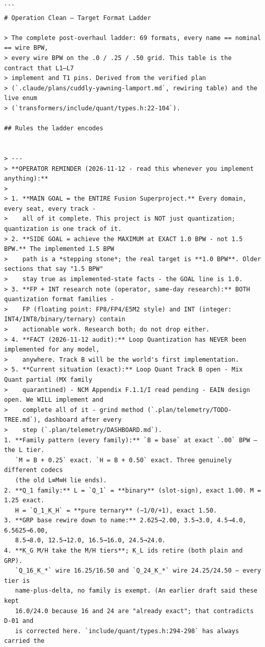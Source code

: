 \begin{Verbatim}[breaklines,breakanywhere,fontsize=\footnotesize]
```
# Operation Clean — Target Format Ladder

> The complete post-overhaul ladder: 69 formats, every name == nominal == wire BPW,
> every wire BPW on the .0 / .25 / .50 grid. This table is the contract that L1–L7
> implement and T1 pins. Derived from the verified plan
> (`.claude/plans/cuddly-yawning-lamport.md`, rewiring table) and the live enum
> (`transformers/include/quant/types.h:22-104`).

## Rules the ladder encodes


> ---
> **OPERATOR REMINDER (2026-11-12 - read this whenever you implement anything):**
>
> 1. **MAIN GOAL = the ENTIRE Fusion Superproject.** Every domain, every seat, every track -
>    all of it complete. This project is NOT just quantization; quantization is one track of it.
> 2. **SIDE GOAL = achieve the MAXIMUM at EXACT 1.0 BPW - not 1.5 BPW.** The implemented 1.5 BPW
>    path is a *stepping stone*; the real target is **1.0 BPW**. Older sections that say "1.5 BPW"
>    stay true as implemented-state facts - the GOAL line is 1.0.
> 3. **FP + INT research note (operator, same-day research):** BOTH quantization format families -
>    FP (floating point: FP8/FP4/E5M2 style) and INT (integer: INT4/INT8/binary/ternary) contain
>    actionable work. Research both; do not drop either.
> 4. **FACT (2026-11-12 audit):** Loop Quantization has NEVER been implemented for any model,
>    anywhere. Track B will be the world's first implementation.
> 5. **Current situation (exact):** Loop Quant Track B open - Mix Quant partial (MX family
>    quarantined) - NCM Appendix F.1.1/I read pending - EAIN design open. We WILL implement and
>    complete all of it - grind method (`.plan/telemetry/TODO-TREE.md`), dashboard after every
>    step (`.plan/telemetry/DASHBOARD.md`).
1. **Family pattern (every family):** `B = base` at exact `.00` BPW — the L tier.
   `M = B + 0.25` exact. `H = B + 0.50` exact. Three genuinely different codecs
   (the old L≡M≡H lie ends).
2. **Q_1 family:** L = `Q_1` = **binary** (slot-sign), exact 1.00. M = 1.25 exact.
   H = `Q_1_K_H` = **pure ternary** (−1/0/+1), exact 1.50.
3. **GRP base rewire down to name:** 2.625→2.00, 3.5→3.0, 4.5→4.0, 6.5625→6.00,
   8.5→8.0, 12.5→12.0, 16.5→16.0, 24.5→24.0.
4. **K_G M/H take the M/H tiers**; K_L ids retire (both plain and GRP).
   `Q_16_K_*` wire 16.25/16.50 and `Q_24_K_*` wire 24.25/24.50 — every tier is
   name-plus-delta, no family is exempt. (An earlier draft said these kept
   16.0/24.0 because 16 and 24 are "already exact"; that contradicts D-01 and
   is corrected here. `include/quant/types.h:294-298` has always carried the

\end{Verbatim}
